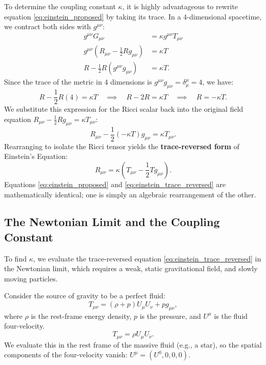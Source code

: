 \documentclass[11pt, a4paper]{report}
\begin{document}
To determine the coupling constant $\kappa$, it is highly advantageous to rewrite equation \eqref{eq:einstein_proposed} by taking its trace. In a 4-dimensional spacetime, we contract both sides with $g^{\mu\nu}$: %
\begin{align}
g^{\mu\nu} G_{\mu\nu} &= \kappa g^{\mu\nu} T_{\mu\nu} \nonumber \\
g^{\mu\nu} \left( R_{\mu\nu} - \frac{1}{2}R g_{\mu\nu} \right) &= \kappa T \nonumber \\
R - \frac{1}{2}R (g^{\mu\nu}g_{\mu\nu}) &= \kappa T.
\end{align}
Since the trace of the metric in 4 dimensions is $g^{\mu\nu}g_{\mu\nu} = \delta^{\mu}_{\mu} = 4$, we have:
\begin{equation}
R - \frac{1}{2}R(4) = \kappa T \quad \implies \quad R - 2R = \kappa T \quad \implies \quad R = -\kappa T. %
\end{equation}
We substitute this expression for the Ricci scalar back into the original field equation $R_{\mu\nu} - \frac{1}{2}Rg_{\mu\nu} = \kappa T_{\mu\nu}$:
\begin{equation}
R_{\mu\nu} - \frac{1}{2}(-\kappa T)g_{\mu\nu} = \kappa T_{\mu\nu}.
\end{equation}
Rearranging to isolate the Ricci tensor yields the \textbf{trace-reversed form} of Einstein's Equation:
\begin{equation}
\label{eq:einstein_trace_reversed}
R_{\mu\nu} = \kappa \left( T_{\mu\nu} - \frac{1}{2}T g_{\mu\nu} \right). %
\end{equation}
Equations \eqref{eq:einstein_proposed} and \eqref{eq:einstein_trace_reversed} are mathematically identical; one is simply an algebraic rearrangement of the other. %

\subsection{The Newtonian Limit and the Coupling Constant}

To find $\kappa$, we evaluate the trace-reversed equation \eqref{eq:einstein_trace_reversed} in the Newtonian limit, which requires a weak, static gravitational field, and slowly moving particles. %

Consider the source of gravity to be a perfect fluid:
\begin{equation}
T_{\mu\nu} = (\rho + p)U_{\mu}U_{\nu} + p g_{\mu\nu}, %
\end{equation}
where $\rho$ is the rest-frame energy density, $p$ is the pressure, and $U^{\mu}$ is the fluid four-velocity. %
\begin{equation}
T_{\mu\nu} = \rho U_{\mu}U_{\nu}. %
\end{equation}
We evaluate this in the rest frame of the massive fluid (e.g., a star), so the spatial components of the four-velocity vanish: $U^{\mu} = (U^{0}, 0, 0, 0)$. %
\end{document}
